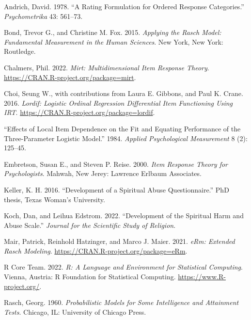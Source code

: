 \documentclass[
  letterpaper,
]{article}
\newlength{\cslhangindent}
\newlength{\cslentryspacingunit} %
\newenvironment{CSLReferences}[2] %
 {%
  \setlength{\parindent}{0pt}
  \ifodd #1
  \let\oldpar\par
  \def\par{\hangindent=\cslhangindent\oldpar}
  \fi
  \setlength{\parskip}{#2\cslentryspacingunit}
 }%
 {}
\begin{document}
\hypertarget{refs}{}
\begin{CSLReferences}{1}{0}
\leavevmode{}%
Andrich, David. 1978. {``A Rating Formulation for Ordered Response
Categories.''} \emph{Psychometrika} 43: 561--73.

\leavevmode{}%
Bond, Trevor G., and Christine M. Fox. 2015. \emph{Applying the Rasch
Model: Fundamental Measurement in the Human Sciences}. New York, New
York: Routledge.

\leavevmode{}%
Chalmers, Phil. 2022. \emph{Mirt: Multidimensional Item Response
Theory}. \url{https://CRAN.R-project.org/package=mirt}.

\leavevmode{}%
Choi, Seung W., with contributions from Laura E. Gibbons, and Paul K.
Crane. 2016. \emph{Lordif: Logistic Ordinal Regression Differential Item
Functioning Using IRT}. \url{https://CRAN.R-project.org/package=lordif}.

\leavevmode{}%
{``Effects of Local Item Dependence on the Fit and Equating Performance
of the Three-Parameter Logistic Model.''} 1984. \emph{Applied
Psychological Measurement} 8 (2): 125--45.

\leavevmode{}%
Embretson, Susan E., and Steven P. Reise. 2000. \emph{Item Response
Theory for Psychologists}. Mahwah, New Jerey: Lawrence Erlbaum
Associates.

\leavevmode{}%
Keller, K. H. 2016. {``Development of a Spiritual Abuse
Questionnaire.''} PhD thesis, Texas Woman's University.

\leavevmode{}%
Koch, Dan, and Leihua Edstrom. 2022. {``Development of the Spiritual
Harm and Abuse Scale.''} \emph{Journal for the Scientific Study of
Religion}.

\leavevmode{}%
Mair, Patrick, Reinhold Hatzinger, and Marco J. Maier. 2021. \emph{eRm:
Extended Rasch Modeling}. \url{https://CRAN.R-project.org/package=eRm}.

\leavevmode{}%
R Core Team. 2022. \emph{R: A Language and Environment for Statistical
Computing}. Vienna, Austria: R Foundation for Statistical Computing.
\url{https://www.R-project.org/}.

\leavevmode{}%
Rasch, Georg. 1960. \emph{Probabilistic Models for Some Intelligence and
Attainment Tests}. Chicago, IL: University of Chicago Press.


\end{CSLReferences}
\end{document}
